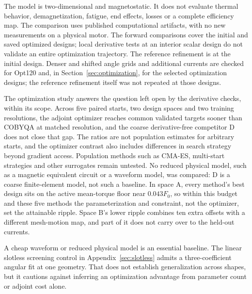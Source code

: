 \documentclass{anvil-paper}
\begin{document}
The model is two-dimensional and magnetostatic. It does not evaluate
thermal behavior, demagnetization, fatigue, end effects, losses or a
complete efficiency map. The comparison uses published computational
artifacts, with no new measurements on a physical motor. The forward comparisons cover the initial and saved optimized designs;
local derivative tests at an interior scalar design do not validate an
entire optimization trajectory. The reference refinement is at the initial
design. Denser and shifted angle grids and additional currents are checked
for Opt120 and, in Section~\ref{sec:optimization}, for the selected
optimization designs; the reference refinement itself was not repeated at
those designs.

The optimization study answers the question left open by the derivative
checks, within its scope. Across five paired starts, two design spaces and
two training resolutions, the adjoint optimizer reaches common validated
targets sooner than COBYQA at matched resolution, and the coarse
derivative-free competitor D does not close that gap. The ratios are not
population estimates for arbitrary starts, and the optimizer contrast also
includes differences in search strategy beyond gradient access.
Population methods such as CMA-ES, multi-start strategies and other
surrogates remain untested. No reduced physical model, such as a magnetic
equivalent circuit or a waveform model, was compared: D is a coarse
finite-element model, not such a baseline. In space A, every method's best
design sits on the active mean-torque floor near $0.043F_0$, so within
this budget and these five methods the parameterization and constraint,
not the optimizer, set the attainable ripple. Space B's lower ripple
combines ten extra offsets with a different mesh-motion map, and part of
it does not carry over to the held-out currents.

A cheap waveform or reduced physical model is an essential baseline.
The linear slotless screening control in Appendix~\ref{sec:slotless}
admits a three-coefficient angular fit at one geometry. That does not
establish generalization across shapes, but it cautions against inferring
an optimization advantage from parameter count or adjoint cost alone.
\end{document}
